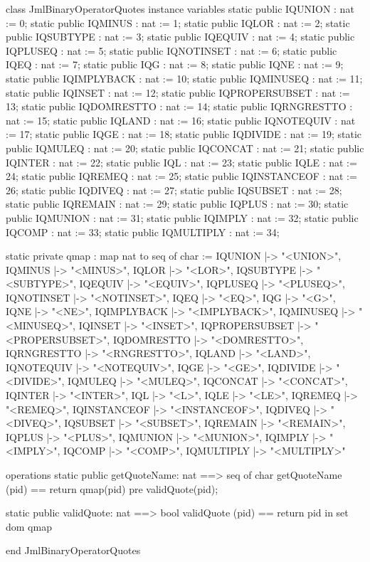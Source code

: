 \begin{vdm_al}
class JmlBinaryOperatorQuotes
instance variables
  static public IQUNION : nat := 0;
  static public IQMINUS : nat := 1;
  static public IQLOR : nat := 2;
  static public IQSUBTYPE : nat := 3;
  static public IQEQUIV : nat := 4;
  static public IQPLUSEQ : nat := 5;
  static public IQNOTINSET : nat := 6;
  static public IQEQ : nat := 7;
  static public IQG : nat := 8;
  static public IQNE : nat := 9;
  static public IQIMPLYBACK : nat := 10;
  static public IQMINUSEQ : nat := 11;
  static public IQINSET : nat := 12;
  static public IQPROPERSUBSET : nat := 13;
  static public IQDOMRESTTO : nat := 14;
  static public IQRNGRESTTO : nat := 15;
  static public IQLAND : nat := 16;
  static public IQNOTEQUIV : nat := 17;
  static public IQGE : nat := 18;
  static public IQDIVIDE : nat := 19;
  static public IQMULEQ : nat := 20;
  static public IQCONCAT : nat := 21;
  static public IQINTER : nat := 22;
  static public IQL : nat := 23;
  static public IQLE : nat := 24;
  static public IQREMEQ : nat := 25;
  static public IQINSTANCEOF : nat := 26;
  static public IQDIVEQ : nat := 27;
  static public IQSUBSET : nat := 28;
  static public IQREMAIN : nat := 29;
  static public IQPLUS : nat := 30;
  static public IQMUNION : nat := 31;
  static public IQIMPLY : nat := 32;
  static public IQCOMP : nat := 33;
  static public IQMULTIPLY : nat := 34;

  static private qmap : map nat to seq of char :=
    { IQUNION |-> "<UNION>",
      IQMINUS |-> "<MINUS>",
      IQLOR |-> "<LOR>",
      IQSUBTYPE |-> "<SUBTYPE>",
      IQEQUIV |-> "<EQUIV>",
      IQPLUSEQ |-> "<PLUSEQ>",
      IQNOTINSET |-> "<NOTINSET>",
      IQEQ |-> "<EQ>",
      IQG |-> "<G>",
      IQNE |-> "<NE>",
      IQIMPLYBACK |-> "<IMPLYBACK>",
      IQMINUSEQ |-> "<MINUSEQ>",
      IQINSET |-> "<INSET>",
      IQPROPERSUBSET |-> "<PROPERSUBSET>",
      IQDOMRESTTO |-> "<DOMRESTTO>",
      IQRNGRESTTO |-> "<RNGRESTTO>",
      IQLAND |-> "<LAND>",
      IQNOTEQUIV |-> "<NOTEQUIV>",
      IQGE |-> "<GE>",
      IQDIVIDE |-> "<DIVIDE>",
      IQMULEQ |-> "<MULEQ>",
      IQCONCAT |-> "<CONCAT>",
      IQINTER |-> "<INTER>",
      IQL |-> "<L>",
      IQLE |-> "<LE>",
      IQREMEQ |-> "<REMEQ>",
      IQINSTANCEOF |-> "<INSTANCEOF>",
      IQDIVEQ |-> "<DIVEQ>",
      IQSUBSET |-> "<SUBSET>",
      IQREMAIN |-> "<REMAIN>",
      IQPLUS |-> "<PLUS>",
      IQMUNION |-> "<MUNION>",
      IQIMPLY |-> "<IMPLY>",
      IQCOMP |-> "<COMP>",
      IQMULTIPLY |-> "<MULTIPLY>" }

operations
  static public getQuoteName: nat ==> seq of char
  getQuoteName (pid) ==
    return qmap(pid)
    pre validQuote(pid);

  static public validQuote: nat ==> bool
  validQuote (pid) == return pid in set dom qmap

end JmlBinaryOperatorQuotes
\end{vdm_al}
